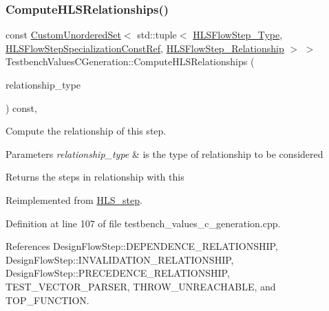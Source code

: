 \subsubsection{\texorpdfstring{Compute\+H\+L\+S\+Relationships()}{ComputeHLSRelationships()}}
{\footnotesize\ttfamily const \hyperlink{classCustomUnorderedSet}{Custom\+Unordered\+Set}$<$ std\+::tuple$<$ \hyperlink{hls__step_8hpp_ada16bc22905016180e26fc7e39537f8d}{H\+L\+S\+Flow\+Step\+\_\+\+Type}, \hyperlink{hls__step_8hpp_a5fdd2edf290c196531d21d68e13f0e74}{H\+L\+S\+Flow\+Step\+Specialization\+Const\+Ref}, \hyperlink{hls__step_8hpp_a3ad360b9b11e6bf0683d5562a0ceb169}{H\+L\+S\+Flow\+Step\+\_\+\+Relationship} $>$ $>$ Testbench\+Values\+C\+Generation\+::\+Compute\+H\+L\+S\+Relationships (\begin{DoxyParamCaption}\item[{const \hyperlink{classDesignFlowStep_a723a3baf19ff2ceb77bc13e099d0b1b7}{Design\+Flow\+Step\+::\+Relationship\+Type}}]{relationship\+\_\+type }\end{DoxyParamCaption}) const\hspace{0.3cm}{\ttfamily [protected]}, {\ttfamily [virtual]}}



Compute the relationship of this step. 


\begin{DoxyParams}{Parameters}
{\em relationship\+\_\+type} & is the type of relationship to be considered \\
\hline
\end{DoxyParams}
\begin{DoxyReturn}{Returns}
the steps in relationship with this 
\end{DoxyReturn}


Reimplemented from \hyperlink{classHLS__step_aed0ce8cca9a1ef18e705fc1032ad4de5}{H\+L\+S\+\_\+step}.



Definition at line 107 of file testbench\+\_\+values\+\_\+c\+\_\+generation.\+cpp.



References Design\+Flow\+Step\+::\+D\+E\+P\+E\+N\+D\+E\+N\+C\+E\+\_\+\+R\+E\+L\+A\+T\+I\+O\+N\+S\+H\+IP, Design\+Flow\+Step\+::\+I\+N\+V\+A\+L\+I\+D\+A\+T\+I\+O\+N\+\_\+\+R\+E\+L\+A\+T\+I\+O\+N\+S\+H\+IP, Design\+Flow\+Step\+::\+P\+R\+E\+C\+E\+D\+E\+N\+C\+E\+\_\+\+R\+E\+L\+A\+T\+I\+O\+N\+S\+H\+IP, T\+E\+S\+T\+\_\+\+V\+E\+C\+T\+O\+R\+\_\+\+P\+A\+R\+S\+ER, T\+H\+R\+O\+W\+\_\+\+U\+N\+R\+E\+A\+C\+H\+A\+B\+LE, and T\+O\+P\+\_\+\+F\+U\+N\+C\+T\+I\+ON.

